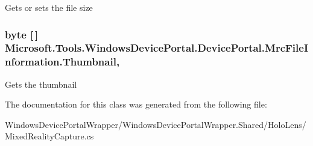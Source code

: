 Gets or sets the file size 

\subsubsection[{\texorpdfstring{Thumbnail}{Thumbnail}}]{\setlength{\rightskip}{0pt plus 5cm}byte \mbox{[}$\,$\mbox{]} Microsoft.\+Tools.\+Windows\+Device\+Portal.\+Device\+Portal.\+Mrc\+File\+Information.\+Thumbnail\hspace{0.3cm}{\ttfamily [get]}, {\ttfamily [set]}}\hypertarget{class_microsoft_1_1_tools_1_1_windows_device_portal_1_1_device_portal_1_1_mrc_file_information_ab9d63dc358d5b0d58895250e455af881}{}\label{class_microsoft_1_1_tools_1_1_windows_device_portal_1_1_device_portal_1_1_mrc_file_information_ab9d63dc358d5b0d58895250e455af881}


Gets the thumbnail 



The documentation for this class was generated from the following file\+:\begin{DoxyCompactItemize}
\item 
Windows\+Device\+Portal\+Wrapper/\+Windows\+Device\+Portal\+Wrapper.\+Shared/\+Holo\+Lens/Mixed\+Reality\+Capture.\+cs\end{DoxyCompactItemize}
